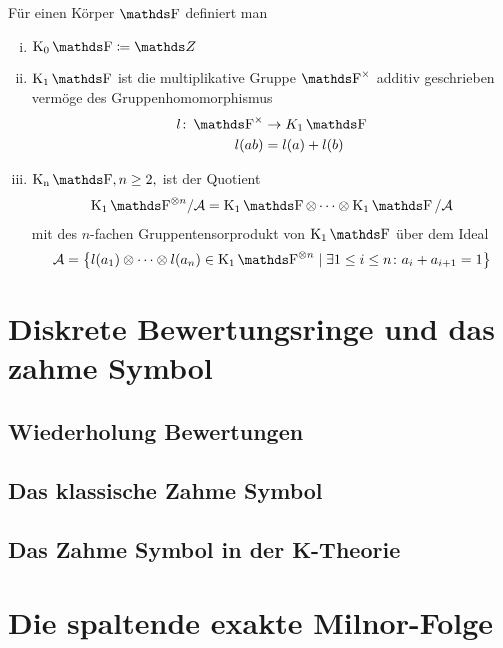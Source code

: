 \documentclass[ngerman,fontsize=11pt, paper=a4, parskip=half, titlepage=true, toc=bib]{scrartcl}
\begin{document}
\begin{Def}[$\KF$]
Für einen Körper $\F$ definiert man
\begin{enumerate}[i)]
\item $\K_0\F\coloneqq \Z$
\item $\K_1\F$ ist die multiplikative Gruppe $\Fx$ additiv geschrieben
  vermöge des Gruppenhomomorphismus 
  \begin{align*}
    l\colon \Fx&\to K_1\F\\
    l(ab)&=l(a)+l(b)
  \end{align*}
\item $\KnF, n\geq 2,$ ist der Quotient 
  \begin{gather*}
    {\K_1\F}^{\otimes n}/\A=\K_1\F\otimes\dotsb\otimes\K_1\F/\A
  \end{gather*}
  mit des $n$-fachen Gruppentensorprodukt von $\K_1\F$ über dem Ideal 
  \begin{gather*}
  \A=\left\{ l(a_1)\otimes\dotsb\otimes l(a_n)\in
    {\K_1\F}^{\otimes n}
    \mid
    \exists 1\leq i\leq n \colon a_i+a_{i+1}=1 \right\}
\end{gather*}
\end{enumerate}
\end{Def}


\section{Diskrete Bewertungsringe und das zahme Symbol}
\cite[][Lemma 2.1]{milnor}

\subsection{Wiederholung Bewertungen}
\begin{Def}[Bewertungsabbildung]\end{Def}
\begin{Def}\end{Def}

\subsection{Das klassische Zahme Symbol}
\begin{Def}\end{Def}

\subsection{Das Zahme Symbol in der K-Theorie}
\begin{Satz}\end{Satz}


\section{Die spaltende exakte Milnor-Folge}
\cite[][Theorem 2.3]{milnor}

\printindex

\nocite{*}
\printbibliography
\end{document}

